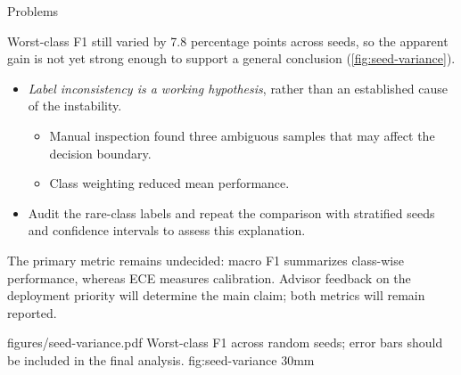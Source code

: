 \documentclass[10pt,a4paper]{article}
\begin{document}
%
\begin{pppbox}{Problems}


Worst-class F1 still varied by 7.8 percentage points across seeds, so the apparent
gain is not yet strong enough to support a general conclusion
(\cref{fig:seed-variance}).

\begin{itemize}
    \item \textit{Label inconsistency is a working hypothesis}, rather than
          an established cause of the instability.
          \begin{itemize}
              \item Manual inspection found three ambiguous samples that
                    may affect the decision boundary.
              \item Class weighting reduced mean performance.
          \end{itemize}
    \item Audit the rare-class labels and repeat the comparison with
          stratified seeds and confidence intervals to assess this explanation.
\end{itemize}



The primary metric remains undecided: macro F1 summarizes class-wise performance,
whereas ECE measures calibration. Advisor feedback on the deployment
priority will determine the main claim; both metrics will remain reported.

\end{pppbox}


\ReportFigure
    {figures/seed-variance.pdf}
    {Worst-class F1 across random seeds; error bars should be included in the final analysis.}
    {fig:seed-variance}
    {30mm}
\end{document}
